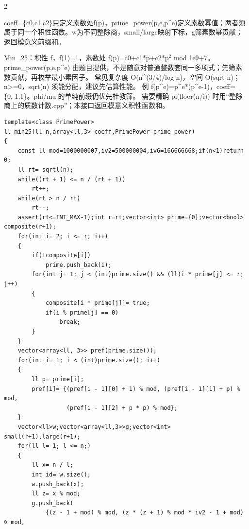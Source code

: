 \documentclass[UTF8,fontset=fandol,a4paper,twoside]{ctexart}
\newcommand{\note}[1]{{\fontsize{10}{12}\selectfont #1\par}}
\begin{document}
\begin{multicols}{2}
\note{coeff=\allowbreak{}\{c0,\allowbreak{}c1,\allowbreak{}c2\}只定义素数处f(\allowbreak{}p)\allowbreak{}，prime\_power(\allowbreak{}p,\allowbreak{}e,\allowbreak{}p\textasciicircum{}e)\allowbreak{}定义素数幂值；两者须属于同一个积性函数。w为不同整除商，small/\allowbreak{}large映射下标，g筛素数幂贡献；返回模意义前缀和。}
\note{Min\_25：积性 f，f(\allowbreak{}1)\allowbreak{}=\allowbreak{}1，素数处 f(\allowbreak{}p)\allowbreak{}=\allowbreak{}c0+\allowbreak{}c1*p+\allowbreak{}c2*p\ensuremath{^2} mod 1e9+\allowbreak{}7。 prime\_power(\allowbreak{}p,\allowbreak{}e,\allowbreak{}p\textasciicircum{}e)\allowbreak{} 由题目提供，不是随意对普通整数套同一多项式；先筛素数贡献，再枚举最小素因子。 常见复杂度 O(\allowbreak{}n\textasciicircum{}(\allowbreak{}3/\allowbreak{}4)\allowbreak{}/\allowbreak{}log n)\allowbreak{}，空间 O(\allowbreak{}sqrt n)\allowbreak{}；n>\allowbreak{}=\allowbreak{}0，sqrt(\allowbreak{}n)\allowbreak{} 须能分配，建议先估算性能。 例 f(\allowbreak{}p\textasciicircum{}e)\allowbreak{}=\allowbreak{}p\textasciicircum{}e*(\allowbreak{}p\textasciicircum{}e-\allowbreak{}1)\allowbreak{}，coeff=\allowbreak{}\{0,\allowbreak{}-\allowbreak{}1,\allowbreak{}1\}。phi/\allowbreak{}mu 的单纯前缀仍优先杜教筛。 需要精确 pi(\allowbreak{}floor(\allowbreak{}n/\allowbreak{}i)\allowbreak{})\allowbreak{} 时用“整除商上的质数计数.\allowbreak{}cpp”；本接口返回模意义积性函数和。}
\begin{lstlisting}
template<class PrimePower>
ll min25(ll n,array<ll,3> coeff,PrimePower prime_power)
{
    const ll mod=1000000007,iv2=500000004,iv6=166666668;if(n<1)return 0;
    ll rt= sqrtl(n);
    while((rt + 1) <= n / (rt + 1))
        rt++;
    while(rt > n / rt)
        rt--;
    assert(rt<=INT_MAX-1);int r=rt;vector<int> prime={0};vector<bool> composite(r+1);
    for(int i= 2; i <= r; i++)
    {
        if(!composite[i])
            prime.push_back(i);
        for(int j= 1; j < (int)prime.size() && (ll)i * prime[j] <= r; j++)
        {
            composite[i * prime[j]]= true;
            if(i % prime[j] == 0)
                break;
        }
    }
    vector<array<ll, 3>> pref(prime.size());
    for(int i= 1; i < (int)prime.size(); i++)
    {
        ll p= prime[i];
        pref[i]= {(pref[i - 1][0] + 1) % mod, (pref[i - 1][1] + p) % mod,
                  (pref[i - 1][2] + p * p) % mod};
    }
    vector<ll>w;vector<array<ll,3>>g;vector<int> small(r+1),large(r+1);
    for(ll l= 1; l <= n;)
    {
        ll x= n / l;
        int id= w.size();
        w.push_back(x);
        ll z= x % mod;
        g.push_back(
            {(z - 1 + mod) % mod, (z * (z + 1) % mod * iv2 - 1 + mod) % mod,

\end{lstlisting}
\end{multicols}
\end{document}
